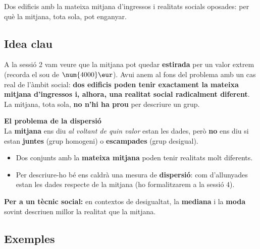 %
{Dos edificis amb la mateixa mitjana d'ingressos i realitats socials oposades: per què la mitjana, tota sola, pot enganyar.}

\subsection{Idea clau}

A la sessió 2 vam veure que la mitjana pot quedar \textbf{estirada} per un valor
extrem (recorda el sou de $\num{4000}\eur$). Avui anem al fons del problema amb un
cas real de l'àmbit social: \textbf{dos edificis poden tenir exactament la mateixa
mitjana d'ingressos i, alhora, una realitat social radicalment diferent}. La mitjana,
tota sola, \textbf{no n'hi ha prou} per descriure un grup.

\begin{idea}
\textbf{El problema de la dispersió}\\
La \textbf{mitjana} ens diu \emph{al voltant de quin valor} estan les dades, però
\textbf{no} ens diu si estan \textbf{juntes} (grup homogeni) o \textbf{escampades}
(grup desigual).
\begin{itemize}[leftmargin=1.4em, itemsep=2pt]
  \item Dos conjunts amb la \textbf{mateixa mitjana} poden tenir realitats molt
        diferents.
  \item Per descriure-ho bé ens caldrà una mesura de \textbf{dispersió}: com d'allunyades
        estan les dades respecte de la mitjana (ho formalitzarem a la sessió 4).
\end{itemize}
\textbf{Per a un tècnic social:} en contextos de desigualtat, la \textbf{mediana} i la
\textbf{moda} sovint descriuen millor la realitat que la mitjana.
\end{idea}

\subsection{Exemples}

